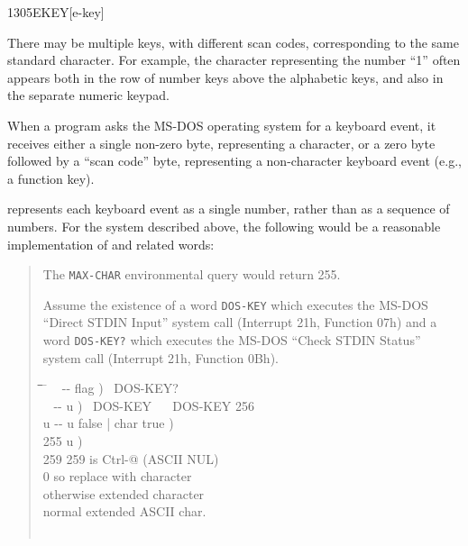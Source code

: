 \begin{worddef}{1305}{EKEY}[e-key]
\begin{rationale}
		There may be multiple keys, with different scan codes,
		corresponding to the same standard character. For example,
		the character representing the number ``1'' often appears both
		in the row of number keys above the alphabetic keys, and also
		in the separate numeric keypad.

		When a program asks the MS-DOS operating system for a keyboard
		event, it receives either a single non-zero byte, representing
		a character, or a zero byte followed by a ``scan code'' byte,
		representing a non-character keyboard event (e.g., a function
		key).

		 represents each keyboard event as a single number,
		rather than as a sequence of numbers. For the system described
		above, the following would be a reasonable implementation of
		 and related words:

		\begin{quote}
			The \texttt{MAX-CHAR} environmental query would return 255.

			Assume the existence of a word
			\texttt{DOS-KEY} 
			which executes the MS-DOS ``Direct STDIN Input'' system call
			(Interrupt 21h, Function 07h) and a word
			\texttt{DOS-KEY?} 
			which executes the MS-DOS ``Check STDIN Status'' system call
			(Interrupt 21h, Function 0Bh).

			\ttfamily
			\begin{tabbing}
			\tab \= \tab \= \tab \= \tab \= \hspace{7em} \= \kill
			\word{:} ~  -{}- flag )~
				DOS-KEY?~  \word{;} \\[\parskip]

			\word{:} ~  -{}- u )~
				DOS-KEY~   ~
					DOS-KEY 256 \word{+}~  \word{;} \\[\parskip]

			\+ \word{:}   u -{}- u false | char true ) \\
				\+  255   		\>\>\>\>	\word{p} u ) \\
					 259 \word{=}  		\>\>\>		 259 is Ctrl-@ (ASCII NUL) \\
					\>  0  \>\>		 so replace with character \\
				\-   		\>\>\>		 otherwise extended character \\
			\-  						\>\>\>\>	 normal extended ASCII char. \\
			\word{;} \\[\parskip]


\end{tabbing}
\end{quote}
\end{rationale}
\end{worddef}
